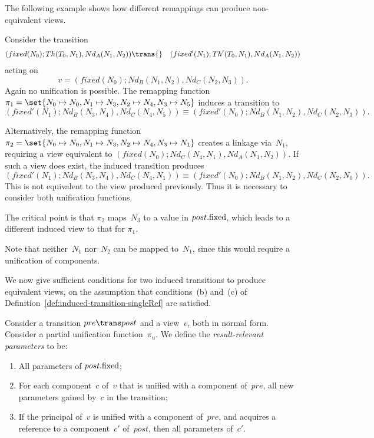 The following example shows how different remappings can produce
non-equivalent views.
% 
\begin{example}\label{example:singleRef-remapping-post-servers}
Consider the transition
% 
\begin{eqnarray*}
(fixed(N_0); Th(T_0,N_1), Nd_A(N_1,N_2)) & \trans{} &
  (fixed'(N_1); Th'(T_0,N_1), Nd_A(N_1,N_2))
\end{eqnarray*}
acting on
\[
v = (fixed(N_0); Nd_B(N_1,N_2), Nd_C(N_2,N_3)).
\]
Again no unification is possible.  The remapping function $\pi_1 = \set{N_0
  \mapsto N_0, \linebreak[1] {N_1 \mapsto N_3}, \linebreak[1] {N_2 \mapsto
    N_4}, \linebreak[1] {N_3 \mapsto N_5}}$ induces a transition to
\[
(fixed'(N_1); Nd_B(N_3,N_4), Nd_C(N_4,N_5)) \equiv
(fixed'(N_0); Nd_B(N_1,N_2), Nd_C(N_2,N_3)).
\]

Alternatively, the remapping function $\pi_2 = \set{{N_0 \mapsto N_0}, {N_1
    \mapsto N_3}, \linebreak[1] {N_2 \mapsto N_4}, \linebreak[1] {N_3 \mapsto
    N_1}}$ creates a linkage via~$N_1$, requiring a view equivalent to
$(fixed(N_0); Nd_C(N_4,N_1), Nd_A(N_1,N_2))$.  If such a view does exist, the
induced transition produces
\[
(fixed'(N_1); Nd_B(N_3,N_4), Nd_C(N_4,N_1)) \equiv
(fixed'(N_0); Nd_B(N_1,N_2), Nd_C(N_2,N_0)).
\]
This is not equivalent to the view produced previously.  Thus it is necessary
to consider both unification functions.

The critical point is that $\pi_2$ maps~$N_3$ to a value in $post.\mathrm{fixed}$,
which leads to a different induced view to that for $\pi_1$.

Note that neither~$N_1$ nor~$N_2$ can be mapped to~$N_1$, since this would
require a unification of components. 
\end{example}


We now give sufficient conditions for two induced transitions to produce
equivalent views, on the assumption that conditions~(b) and~(c) of
Definition~\ref{def:induced-transition-singleRef} are satisfied. 

\begin{definition}
Consider a transition $pre \trans post$ and a view~$v$, both in normal form.
Consider a partial unification function~$\pi_u$.  We define the
\emph{result-relevant parameters} to be:
%
\begin{enumerate}
\item\label{item:singleRef:remappings-equivalent:post-servers} All parameters
  of $post.\mathrm{fixed}$;

\item For each component~$c$ of~$v$ that is unified with a component of~$pre$,
  all new parameters gained by~$c$ in the transition;

\item If the principal of~$v$ is unified with a component of~$pre$, and
  acquires a reference to a component~$c'$ of~$post$, then all parameters
  of~$c'$. 
\end{enumerate}
\end{definition}

